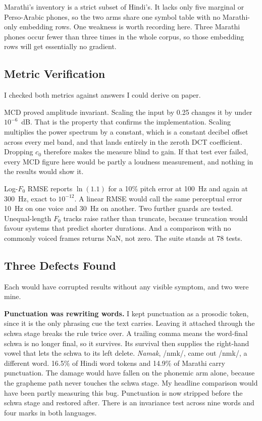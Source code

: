 \documentclass[12pt,a4paper]{article}
\makeatletter
\newcommand{\ipaschwa}{\textipa{@}}
\newcommand{\ipaA}[1]{/#1/}
\newcommand{\ipaschwa}{\symbol{"0259}}
\newcommand{\ipaA}[1]{/#1/}
\makeatother
\begin{document}
Marathi's inventory is a strict subset of Hindi's. It lacks only five marginal
or Perso-Arabic phones, so the two arms share one symbol table with no
Marathi-only embedding rows. One weakness is worth recording here. Three
Marathi phones occur fewer than three times in the whole corpus, so those
embedding rows will get essentially no gradient.

\subsection{Metric Verification}

I checked both metrics against answers I could derive on paper.

MCD proved amplitude invariant. Scaling the input by 0.25 changes it by under
$10^{-6}$~dB. That is the property that confirms the implementation. Scaling
multiplies the power spectrum by a constant, which is a constant decibel offset
across every mel band, and that lands entirely in the zeroth DCT coefficient.
Dropping $c_0$ therefore makes the measure blind to gain. If that test ever
failed, every MCD figure here would be partly a loudness measurement, and
nothing in the results would show it.

Log-$F_0$ RMSE reports $\ln(1.1)$ for a 10\% pitch error at 100~Hz and again
at 300~Hz, exact to $10^{-12}$. A linear RMSE would call the same perceptual
error 10~Hz on one voice and 30~Hz on another. Two further guards are tested.
Unequal-length $F_0$ tracks raise rather than truncate, because truncation
would favour systems that predict shorter durations. And a comparison with no
commonly voiced frames returns NaN, not zero. The suite stands at 78 tests.

\subsection{Three Defects Found}

Each would have corrupted results without any visible symptom, and two were
mine.

\textbf{Punctuation was rewriting words.} I kept punctuation as a prosodic
token, since it is the only phrasing cue the text carries. Leaving it attached
through the schwa stage breaks the rule twice over. A trailing comma means the
word-final schwa is no longer final, so it survives. Its survival then supplies
the right-hand vowel that lets the schwa to its left delete. \textit{Namak},
\ipaA{n\ipaschwa m\ipaschwa k}, came out \ipaA{n\ipaschwa mk\ipaschwa}, a
different word. 16.5\% of Hindi word tokens and 14.9\% of Marathi carry
punctuation. The damage would have fallen on the phonemic arm alone, because
the grapheme path never touches the schwa stage. My headline comparison would
have been partly measuring this bug. Punctuation is now stripped before the
schwa stage and restored after. There is an invariance test across nine words
and four marks in both languages.
\end{document}
